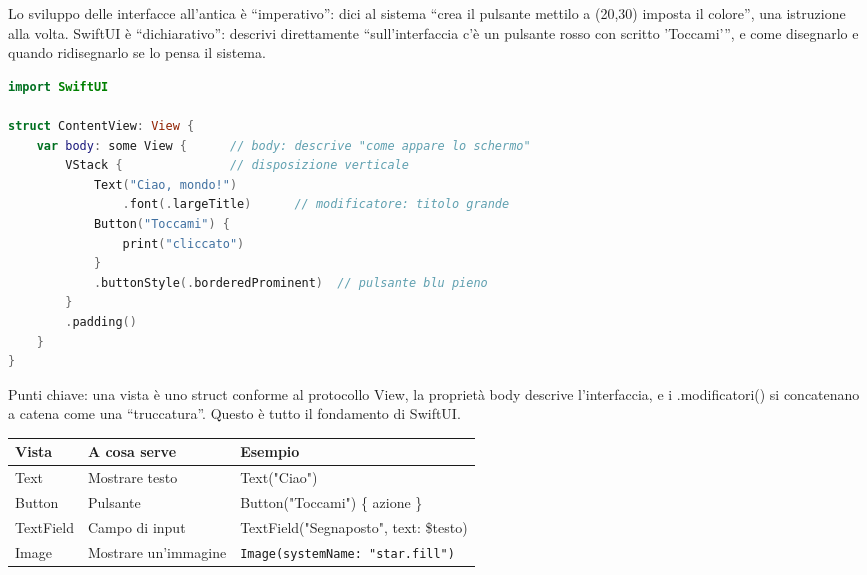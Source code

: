 


Lo sviluppo delle interfacce all'antica è “imperativo”: dici al sistema “crea il pulsante mettilo a (20,30) imposta il colore”, una istruzione alla volta. SwiftUI è “dichiarativo”: descrivi direttamente “sull'interfaccia c'è un pulsante rosso con scritto 'Toccami'”, e come disegnarlo e quando ridisegnarlo se lo pensa il sistema.

\begin{lstlisting}[language=Swift]
import SwiftUI

struct ContentView: View {
    var body: some View {      // body: descrive "come appare lo schermo"
        VStack {               // disposizione verticale
            Text("Ciao, mondo!")
                .font(.largeTitle)      // modificatore: titolo grande
            Button("Toccami") {
                print("cliccato")
            }
            .buttonStyle(.borderedProminent)  // pulsante blu pieno
        }
        .padding()
    }
}
\end{lstlisting}

Punti chiave: una vista è uno struct conforme al protocollo View, la proprietà body descrive l'interfaccia, e i .modificatori() si concatenano a catena come una “truccatura”. Questo è tutto il fondamento di SwiftUI.


\begin{center}
\begin{tabularx}{\linewidth}{|X|X|X|}
\hline
\textbf{Vista} & \textbf{A cosa serve} & \textbf{Esempio} \tabularnewline
\hline
Text & Mostrare testo & Text("Ciao") \tabularnewline
Button & Pulsante & Button("Toccami") \{ azione \} \tabularnewline
TextField & Campo di input & TextField("Segnaposto", text: \$testo) \tabularnewline
Image & Mostrare un'immagine & \texttt{Image(systemName: "star.\allowbreak fill")} \tabularnewline
\hline
\end{tabularx}
\end{center}

